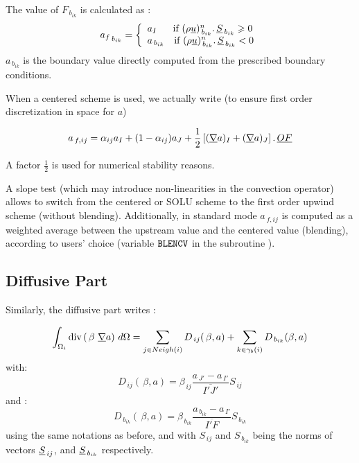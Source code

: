 The value of $F_{\,b_{ik}}$ is calculated as :
\begin{equation}\notag
{a_f}_{\,{b}_{ik}}=\left\lbrace\begin{array}{l}
a_I \text{ \ \ \ \ if }(\rho \underline{u})_{\,{b}_{ik}}^n
\text{.}\, \underline{S}_{\,{b}_{ik}}\geqslant 0\\
a_{\,{b}_{ik}}\text{ \ \ if } (\rho \underline{u})_{\,{b}_{ik}}^n
\text{.}\, \underline{S}_{\,{b}_{ik}} < 0
\end{array}\right.
\end{equation}
$a_{\,{b}_{ik}}$ is the boundary value directly computed from the prescribed boundary conditions.


When a centered scheme is used, we actually write (to ensure first order discretization in space for $a$)

\begin{equation}\notag
a_{\,f,ij} = \alpha_{ij} a_I +  (1-\alpha_{ij}) a_J  + \displaystyle
\frac{1}{2}\left[(\underline{\nabla} a)_I+(\underline{\nabla} a)_J\right] \text{.}\, \underline{OF}
\end{equation}

A factor $\displaystyle \frac{1}{2}$ is used for numerical stability reasons.

A slope test (which may introduce non-linearities in the convection operator) allows to switch from
the centered or SOLU scheme to the first order upwind scheme (without blending). Additionally, in standard mode $a_{\,f,ij}$ is computed as a weighted average between the upstream value and the centered value (blending), according to users' choice (variable $\text{\texttt{BLENCV}}$ in the subroutine  ).


\subsection*{\bf Diffusive Part}

Similarly, the diffusive part writes :

\begin{equation}\notag
\int_{\Omega_i}{\text{div}\,(\,\beta\ \underline{\nabla} a)\  d\Omega} =
\sum_{j\in Neigh\left(i\right)}{D_{\,ij}(\,\beta, a)}
+\sum_{k\in {\gamma_b(i)}} {D_{\,{b}_{ik}}(\beta, a)}
\end{equation}
with:
\begin{equation}
D_{\,ij}(\,\beta, a) = \beta_{\,ij}
\frac{a_{\,J'}- a_{\,I'}}{\overline{I'J'}} S_{\,ij}
\end{equation}
and :
\begin{equation}
D_{\,b_{ik}}(\,\beta, a) = \beta_{\,b_{ik}}
\frac{a_{\,b_{ik}}-a_{\,I'}}{\overline{I'F}} S_{\,b_{ik}}
\end{equation}
using the same notations as before, and with $S_{\,ij}$ and $S_{\,b_{ik}}$ being the norms of  vectors
$\underline{S}_{\,ij}$, and $\underline{S}_{\,b_{ik}}$ respectively.

